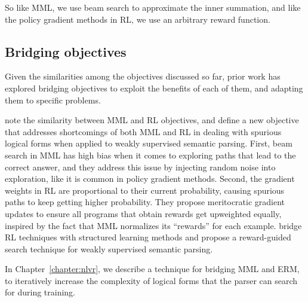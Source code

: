 \noindent So like MML, we use beam search to approximate the inner summation,
and like the policy gradient methods in RL, we use an arbitrary reward function.

\subsection{Bridging objectives}
Given the similarities among the objectives discussed so far, prior work has
explored bridging objectives to exploit the benefits of each
of them, and adapting them to specific problems.

\citet{guu2017bridging} note the
similarity between MML and RL objectives, and define a new objective that
addresses shortcomings of both MML and RL in dealing with spurious logical forms
when applied to weakly supervised semantic parsing. First, beam search in MML
has high bias when it comes to exploring paths that
lead to the correct answer, and they address this issue by injecting random
noise into exploration, like it is common in policy gradient methods. Second,
the gradient weights in RL are proportional to their current probability,
causing spurious paths to keep getting higher probability. They propose
meritocratic gradient updates to ensure all programs that obtain rewards get
upweighted equally, inspired by the fact that MML normalizes its
``rewards'' for each example. \citet{IyyerSQA2016} bridge RL techniques with
structured learning methods and
propose a reward-guided search technique for weakly supervised semantic parsing.

In Chapter~\ref{chapter:nlvr}, we describe a technique for bridging MML and
ERM, to iteratively increase the complexity of logical forms that the parser can
search for during training.
